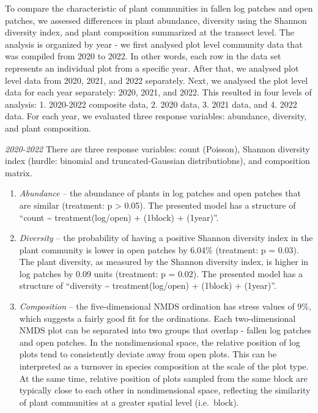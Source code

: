 \documentclass[
]{article}
\providecommand{\tightlist}{%
  \setlength{\itemsep}{0pt}\setlength{\parskip}{0pt}}
\begin{document}
To compare the characteristic of plant communities in fallen log patches
and open patches, we assessed differences in plant abundance, diversity
using the Shannon diversity index, and plant composition summarized at
the transect level. The analysis is organized by year - we first
analysed plot level community data that was compiled from 2020 to 2022.
In other words, each row in the data set represents an individual plot
from a specific year. After that, we analysed plot level data from 2020,
2021, and 2022 separately. Next, we analysed the plot level data for
each year separately: 2020, 2021, and 2022. This resulted in four levels
of analysis: 1. 2020-2022 composite data, 2. 2020 data, 3. 2021 data,
and 4. 2022 data. For each year, we evaluated three response variables:
abundance, diversity, and plant composition.

\emph{2020-2022} There are three response variables: count (Poisson),
Shannon diversity index (hurdle: binomial and truncated-Gaussian
distributiobns), and composition matrix.

\begin{enumerate}
\def\labelenumi{\arabic{enumi}.}
\tightlist
\item
  \emph{Abundance} -- the abundance of plants in log patches and open
  patches that are similar (treatment: p \textgreater{} 0.05). The
  presented model has a structure of ``count \textasciitilde{}
  treatment(log/open) + (1\textbar block) + (1\textbar year)''.
\item
  \emph{Diversity} -- the probability of having a positive Shannon
  diversity index in the plant community is lower in open patches by
  6.04\% (treatment: p = 0.03). The plant diversity, as measured by the
  Shannon diversity index, is higher in log patches by 0.09 units
  (treatment: p = 0.02). The presented model has a structure of
  ``diversity \textasciitilde{} treatment(log/open) + (1\textbar block)
  + (1\textbar year)''.
\item
  \emph{Composition} -- the five-dimensional NMDS ordination has stress
  values of 9\%, which suggests a fairly good fit for the ordinations.
  Each two-dimensional NMDS plot can be separated into two groups that
  overlap - fallen log patches and open patches. In the nondimensional
  space, the relative position of log plots tend to consistently deviate
  away from open plots. This can be interpreted as a turnover in species
  composition at the scale of the plot type. At the same time, relative
  position of plots sampled from the same block are typically close to
  each other in nondimensional space, reflecting the similarity of plant
  communities at a greater spatial level (i.e.~block).
\end{enumerate}
\end{document}
